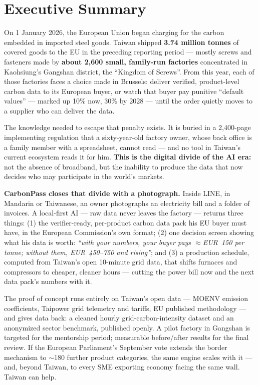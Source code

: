 \section{Executive Summary}\label{sec:exec}

On 1 January 2026, the European Union began charging for the carbon embedded in
imported steel goods. Taiwan shipped \textbf{3.74 million tonnes} of covered
goods to the EU in the preceding reporting period --- mostly screws and
fasteners made by \textbf{about 2,600 small, family-run factories}
concentrated in Kaohsiung's Gangshan district, the ``Kingdom of
Screws''\cite{tpt-cbam}. From this year, each of those factories faces a choice
made in Brussels: deliver verified, product-level carbon data to its European
buyer, or watch that buyer pay punitive ``default values'' --- marked up 10\%
now, 30\% by 2028\cite{omm} --- until the order quietly moves to a supplier who
can deliver the data.

The knowledge needed to escape that penalty exists. It is buried in a
2,400-page implementing regulation\cite{omm} that a sixty-year-old factory
owner, whose back office is a family member with a spreadsheet, cannot read ---
and no tool in Taiwan's current ecosystem reads it for him\cite{caas,idb,tpt-cbam}.
\textbf{This is the digital divide of the AI era:} not the absence of
broadband, but the inability to produce the data that now decides who may
participate in the world's markets.

\textbf{CarbonPass closes that divide with a photograph.} Inside LINE, in
Mandarin or Taiwanese, an owner photographs an electricity bill and a folder of
invoices. A local-first AI --- raw data never leaves the factory --- returns
three things: (1) the verifier-ready, per-product carbon data pack his EU buyer
must have, in the European Commission's own format; (2) one decision screen
showing what his data is worth: \emph{``with your numbers, your buyer pays
$\approx$EUR~150 per tonne; without them, EUR~450--750 and
rising''}\cite{ecprice,specialinsert}; and (3) a production schedule, computed
from Taiwan's open 10-minute grid data\cite{taipowerdata}, that shifts furnaces
and compressors to cheaper, cleaner hours --- cutting the power bill now and
the next data pack's numbers with it.

The proof of concept runs entirely on Taiwan's open data --- MOENV emission
coefficients, Taipower grid telemetry and tariffs, EU published methodology ---
and gives data back: a cleaned hourly grid-carbon-intensity dataset and an
anonymized sector benchmark, published openly. A pilot factory in Gangshan is
targeted for the mentorship period; measurable before/after results for the
final review. If the European Parliament's September vote extends the border
mechanism to $\sim$180 further product categories\cite{akin}, the same engine
scales with it --- and, beyond Taiwan, to every SME exporting economy facing
the same wall. Taiwan can help.


